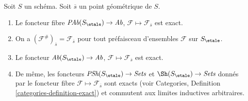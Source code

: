 \begin{lemma}
\label{lemma-stalk-exact}
Soit $S$ un sch\'ema. Soit $\overline{s}$ un point g\'eom\'etrique de $S$.
\begin{enumerate}
\item Le foncteur fibre
$\textit{PAb}(S_\etale) \to \textit{Ab}$,
$\mathcal{F}  \mapsto  \mathcal{F}_{\overline{s}}$
est exact.
\item On a $(\mathcal{F}^\#)_{\overline{s}} = \mathcal{F}_{\overline{s}}$
pour tout pr\'efaisceau d'ensembles $\mathcal{F}$ sur $S_\etale$.
\item Le foncteur
$\textit{Ab}(S_\etale) \to \textit{Ab}$,
$\mathcal{F} \mapsto \mathcal{F}_{\overline{s}}$ est exact.
\item De m\^eme, les foncteurs
$\textit{PSh}(S_\etale) \to \textit{Sets}$ et
$\Sh(S_\etale) \to \textit{Sets}$ donn\'es par le foncteur fibre
$\mathcal{F} \mapsto \mathcal{F}_{\overline{s}}$ sont exacts (voir
Categories, Definition \ref{categories-definition-exact})
et commutent aux limites inductives arbitraires.
\end{enumerate}
\end{lemma}

